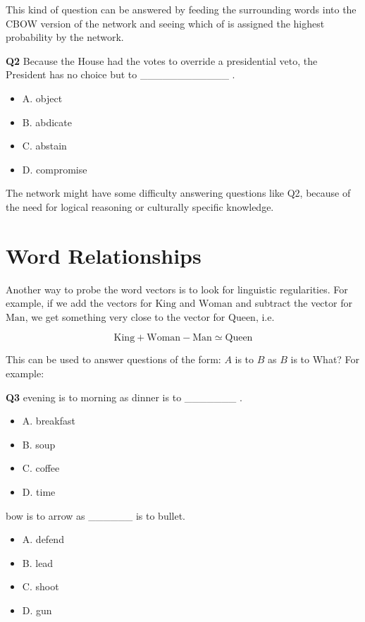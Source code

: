 \documentclass[11pt]{article}
\begin{document}
This kind of question can be answered by feeding the surrounding words into the CBOW version of the network and seeing which of  is assigned the highest probability by the network.

\textbf{Q2}
Because the House had the votes to override a presidential veto, the President has no choice but to _\___________ .

\begin{itemize}
  \item A. object
  \item B. abdicate
  \item C. abstain
  \item D. compromise
\end{itemize}

The network might have some difficulty answering questions like Q2, because of
the need for logical reasoning or culturally specific knowledge.

\section{Word Relationships}\label{sec:word-relationships2}
Another way to probe the word vectors is to look for linguistic regularities.
For example, if we add the vectors for $\text{King}$ and $\text{Woman}$ and
subtract the vector for $\text{Man}$, we get something very close to the vector
for $\text{Queen}$, i.e.

\[\text{King} + \text{Woman} - \text{Man} \simeq \text{Queen}\]

This can be used to answer questions of the form: $A$ is to $B$ as $B$ is to
What?
For example:

\textbf{Q3}
evening is to morning as dinner is to _______ .
\begin{itemize}
  \item A. breakfast
  \item B. soup
  \item C. coffee
  \item D. time
\end{itemize}

bow is to arrow as ______ is to bullet.

\begin{itemize}
  \item A. defend
  \item B. lead
  \item C. shoot
  \item D. gun
\end{itemize}
\end{document}
